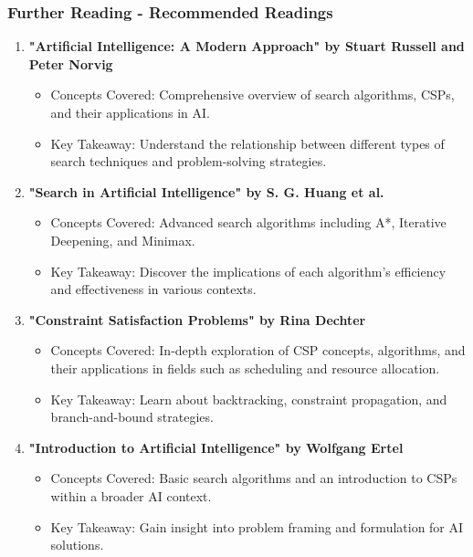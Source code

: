 \documentclass[aspectratio=169]{beamer}
\begin{document}
\begin{frame}[fragile]
    \frametitle{Further Reading - Recommended Readings}
    \begin{enumerate}
        \item \textbf{"Artificial Intelligence: A Modern Approach" by Stuart Russell and Peter Norvig}
        \begin{itemize}
            \item Concepts Covered: Comprehensive overview of search algorithms, CSPs, and their applications in AI.
            \item Key Takeaway: Understand the relationship between different types of search techniques and problem-solving strategies.
        \end{itemize}
        
        \item \textbf{"Search in Artificial Intelligence" by S. G. Huang et al.}
        \begin{itemize}
            \item Concepts Covered: Advanced search algorithms including A*, Iterative Deepening, and Minimax.
            \item Key Takeaway: Discover the implications of each algorithm's efficiency and effectiveness in various contexts.
        \end{itemize}
        
        \item \textbf{"Constraint Satisfaction Problems" by Rina Dechter}
        \begin{itemize}
            \item Concepts Covered: In-depth exploration of CSP concepts, algorithms, and their applications in fields such as scheduling and resource allocation.
            \item Key Takeaway: Learn about backtracking, constraint propagation, and branch-and-bound strategies.
        \end{itemize}
        
        \item \textbf{"Introduction to Artificial Intelligence" by Wolfgang Ertel}
        \begin{itemize}
            \item Concepts Covered: Basic search algorithms and an introduction to CSPs within a broader AI context.
            \item Key Takeaway: Gain insight into problem framing and formulation for AI solutions.
        \end{itemize}
    \end{enumerate}
\end{frame}
\end{document}
